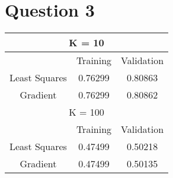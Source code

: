 \documentclass{article}
\begin{document}
\section*{Question 3}

\begin{center}
\begin{tabular}{ | c | c | c | }
\hline
\multicolumn{3}{|c|}{ K = 10 } \\
\hline
 & Training & Validation \\
\hline
Least Squares & 0.76299 & 0.80863\\ 
\hline
Gradient & 0.76299 & 0.80862 \\ 
\hline

\hline 
\hline

\multicolumn{3}{|c|}{ K = 100 } \\
\hline
 & Training & Validation \\
\hline
Least Squares & 0.47499 & 0.50218 \\ 
\hline
Gradient & 0.47499 & 0.50135 \\ 
\hline
\end{tabular}
\end{center}
\end{document}

